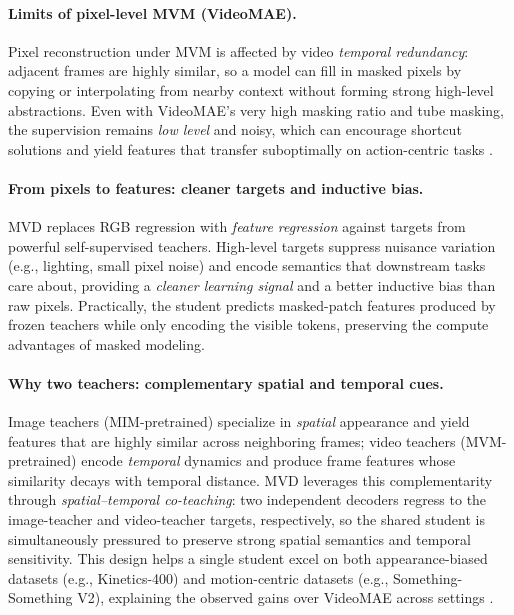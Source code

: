 \begin{enrichment}
\begin{enrichment}
            \paragraph{Limits of pixel-level MVM (VideoMAE).}
            Pixel reconstruction under MVM is affected by video \emph{temporal redundancy}: adjacent frames are highly similar, so a model can fill in masked pixels by copying or interpolating from nearby context without forming strong high-level abstractions. Even with VideoMAE’s very high masking ratio and tube masking, the supervision remains \emph{low level} and noisy, which can encourage shortcut solutions and yield features that transfer suboptimally on action-centric tasks \cite{tong2022_videomae,wang2023_mvd}.
            
            \newpage
            
            \paragraph{From pixels to features: cleaner targets and inductive bias.}
            MVD \cite{wang2023_mvd} replaces RGB regression with \emph{feature regression} against targets from powerful self-supervised teachers. High-level targets suppress nuisance variation (e.g., lighting, small pixel noise) and encode semantics that downstream tasks care about, providing a \emph{cleaner learning signal} and a better inductive bias than raw pixels. Practically, the student predicts masked-patch features produced by frozen teachers while only encoding the visible tokens, preserving the compute advantages of masked modeling.
            
            \paragraph{Why two teachers: complementary spatial and temporal cues.}
            Image teachers (MIM-pretrained) specialize in \emph{spatial} appearance and yield features that are highly similar across neighboring frames; video teachers (MVM-pretrained) encode \emph{temporal} dynamics and produce frame features whose similarity decays with temporal distance. MVD leverages this complementarity through \emph{spatial–temporal co-teaching}: two independent decoders regress to the image-teacher and video-teacher targets, respectively, so the shared student is simultaneously pressured to preserve strong spatial semantics and temporal sensitivity. This design helps a single student excel on both appearance-biased datasets (e.g., Kinetics-400) and motion-centric datasets (e.g., Something-Something V2), explaining the observed gains over VideoMAE across settings \cite{wang2023_mvd}.
            

\end{enrichment}
\end{enrichment}
